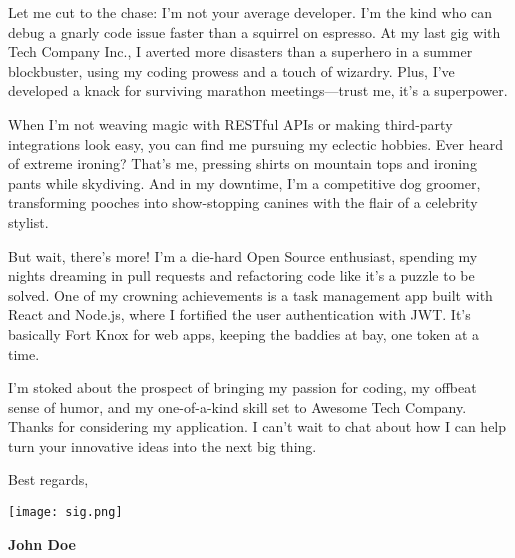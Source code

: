 \begin{minipage}[t][\textheight-1em]{\textwidth}
	Let me cut to the chase: I’m not your average developer. I’m the kind who can debug a gnarly code issue faster than a squirrel on espresso. At my last gig with Tech Company Inc., I averted more disasters than a superhero in a summer blockbuster, using my coding prowess and a touch of wizardry. Plus, I’ve developed a knack for surviving marathon meetings—trust me, it’s a superpower.

    \vspace{1em}

	When I'm not weaving magic with RESTful APIs or making third-party integrations look easy, you can find me pursuing my eclectic hobbies. Ever heard of extreme ironing? That's me, pressing shirts on mountain tops and ironing pants while skydiving. And in my downtime, I’m a competitive dog groomer, transforming pooches into show-stopping canines with the flair of a celebrity stylist.

    \vspace{1em}

	But wait, there’s more! I’m a die-hard Open Source enthusiast, spending my nights dreaming in pull requests and refactoring code like it’s a puzzle to be solved. One of my crowning achievements is a task management app built with React and Node.js, where I fortified the user authentication with JWT. It's basically Fort Knox for web apps, keeping the baddies at bay, one token at a time.

    \vspace{1em}

	I’m stoked about the prospect of bringing my passion for coding, my offbeat sense of humor, and my one-of-a-kind skill set to Awesome Tech Company. Thanks for considering my application. I can’t wait to chat about how I can help turn your innovative ideas into the next big thing.

	\vspace{1em}

	\begin{flushright}
		Best regards,

		\vspace{2em}

		\texttt{[image: sig.png]} %

		\textbf{John Doe}
	\end{flushright}

\end{minipage}
